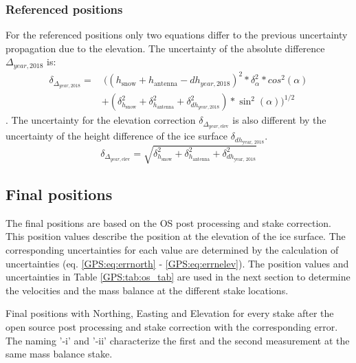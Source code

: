 \subsubsection*{Referenced positions}

For the referenced positions only two equations differ to the previous uncertainty propagation due to the elevation. 
The uncertainty of the absolute difference $\Delta_{year,2018}$ is:
\begin{equation}
\begin{split}
\delta_{\Delta_{year,2018}} = & 
\ ((h_{\text{snow}} + h_{\text{antenna}} - dh_{year,2018})^2 * \delta_{\alpha}^2 * cos^2(\alpha)\\
&+ (\delta_{h_{\text{snow}}}^2 + \delta_{h_{\text{antenna}}}^2 + \delta_{dh_{year,2018}}^2) * \sin^2(\alpha))^{1/2}
\end{split}
\end{equation}
.
The uncertainty for the elevation correction $\delta_{\Delta_{year, \text{elev}}}$ is also different by the uncertainty of the height difference of the ice surface $\delta_{dh_{\text{year, 2018}}}$.
\begin{equation}
	\delta_{\Delta_{year, \text{elev}}} = \sqrt{\delta_{h_{\text{snow}}}^2 + \delta_{h_{\text{antenna}}}^2 + \delta_{dh_{\text{year, 2018}}}^2}
\end{equation}

\subsection{Final positions}

The final positions are based on the OS post processing and stake correction.
This position values describe the position at the elevation of the ice surface. 
The corresponding uncertainties for each value are determined by the calculation of uncertainties (eq. \ref{GPS:eq:errnorth} - \ref{GPS:eq:errnelev}). 
The position values and uncertainties in Table \ref{GPS:tab:os_tab} are used in the next section to determine the velocities and the mass balance at the different stake locations. 

\begin{table}[H]
	\caption{Final positions with Northing, Easting and Elevation for every stake after the open source post processing and stake correction with the corresponding error. The naming '-i' and '-ii' characterize the first and the second measurement at the same mass balance stake.}
	\centering
	
	\label{GPS:tab:os_tab}
\end{table}

